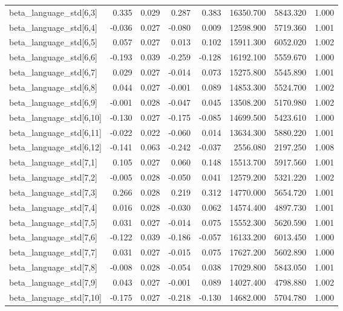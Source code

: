 \begin{tabular}{lrrrrrrr}
beta\_language\_std[6,3] & 0.335 & 0.029 & 0.287 & 0.383 & 16350.700 & 5843.320 & 1.000 \\
beta\_language\_std[6,4] & -0.036 & 0.027 & -0.080 & 0.009 & 12598.900 & 5719.360 & 1.001 \\
beta\_language\_std[6,5] & 0.057 & 0.027 & 0.013 & 0.102 & 15911.300 & 6052.020 & 1.002 \\
beta\_language\_std[6,6] & -0.193 & 0.039 & -0.259 & -0.128 & 16192.100 & 5559.670 & 1.000 \\
beta\_language\_std[6,7] & 0.029 & 0.027 & -0.014 & 0.073 & 15275.800 & 5545.890 & 1.001 \\
beta\_language\_std[6,8] & 0.044 & 0.027 & -0.001 & 0.089 & 14853.300 & 5524.700 & 1.002 \\
beta\_language\_std[6,9] & -0.001 & 0.028 & -0.047 & 0.045 & 13508.200 & 5170.980 & 1.002 \\
beta\_language\_std[6,10] & -0.130 & 0.027 & -0.175 & -0.085 & 14699.500 & 5423.610 & 1.000 \\
beta\_language\_std[6,11] & -0.022 & 0.022 & -0.060 & 0.014 & 13634.300 & 5880.220 & 1.001 \\
beta\_language\_std[6,12] & -0.141 & 0.063 & -0.242 & -0.037 & 2556.080 & 2197.250 & 1.008 \\
beta\_language\_std[7,1] & 0.105 & 0.027 & 0.060 & 0.148 & 15513.700 & 5917.560 & 1.001 \\
beta\_language\_std[7,2] & -0.005 & 0.028 & -0.050 & 0.041 & 12579.200 & 5321.220 & 1.002 \\
beta\_language\_std[7,3] & 0.266 & 0.028 & 0.219 & 0.312 & 14770.000 & 5654.720 & 1.001 \\
beta\_language\_std[7,4] & 0.016 & 0.028 & -0.030 & 0.062 & 14574.400 & 4897.730 & 1.001 \\
beta\_language\_std[7,5] & 0.031 & 0.027 & -0.014 & 0.075 & 15552.300 & 5620.590 & 1.001 \\
beta\_language\_std[7,6] & -0.122 & 0.039 & -0.186 & -0.057 & 16133.200 & 6013.450 & 1.000 \\
beta\_language\_std[7,7] & 0.031 & 0.027 & -0.015 & 0.075 & 17627.200 & 5602.890 & 1.000 \\
beta\_language\_std[7,8] & -0.008 & 0.028 & -0.054 & 0.038 & 17029.800 & 5843.050 & 1.001 \\
beta\_language\_std[7,9] & 0.043 & 0.027 & -0.001 & 0.089 & 14027.400 & 4798.880 & 1.002 \\
beta\_language\_std[7,10] & -0.175 & 0.027 & -0.218 & -0.130 & 14682.000 & 5704.780 & 1.000 \\

\end{tabular}

